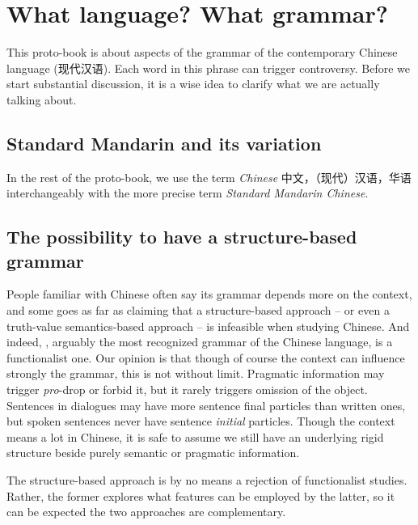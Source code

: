 \documentclass[../main.tex]{subfiles}
\begin{document}
\section{What language? What grammar?}

This proto-book is about aspects of the grammar of the contemporary Chinese language (现代汉语). 
Each word in this phrase can trigger controversy. Before we start substantial discussion, it is a wise idea 
to clarify what we are actually talking about. 

\subsection{Standard Mandarin and its variation}


In the rest of the proto-book, we use the term \emph{Chinese} 中文，（现代）汉语，华语 interchangeably with 
the more precise term \emph{Standard Mandarin Chinese}.

\subsection{The possibility to have a structure-based grammar}\label{sec:structure-based}

People familiar with Chinese often say its grammar depends more on the context, and some goes as far as 
claiming that a structure-based approach -- or even a truth-value semantics-based approach -- is infeasible 
when studying Chinese. And indeed, \citet{li1989mandarin}, arguably the most recognized grammar of the Chinese 
language, is a functionalist one. Our opinion is that though of course the context can influence strongly the 
grammar, this is not without limit. Pragmatic information may trigger \emph{pro}-drop or forbid it, but it 
rarely triggers omission of the object. Sentences in dialogues may have more sentence final particles than 
written ones, but spoken sentences never have sentence \emph{initial} particles. Though the context means 
a lot in Chinese, it is safe to assume we still have an underlying rigid structure beside purely semantic 
or pragmatic information.

The structure-based approach is by no means a rejection of functionalist studies. Rather, the former explores 
what features can be employed by the latter, so it can be expected the two approaches are complementary.
\end{document}

